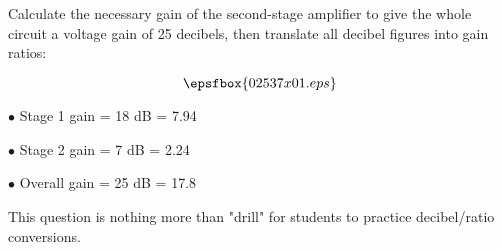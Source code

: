 

Calculate the necessary gain of the second-stage amplifier to give the whole circuit a voltage gain of 25 decibels, then translate all decibel figures into gain ratios:

$$\epsfbox{02537x01.eps}$$







\medskip
\goodbreak
\item{$\bullet$} Stage 1 gain = 18 dB = 7.94
\item{$\bullet$} Stage 2 gain = 7 dB = 2.24
\item{$\bullet$} Overall gain = 25 dB = 17.8
\medskip







This question is nothing more than "drill" for students to practice decibel/ratio conversions.




